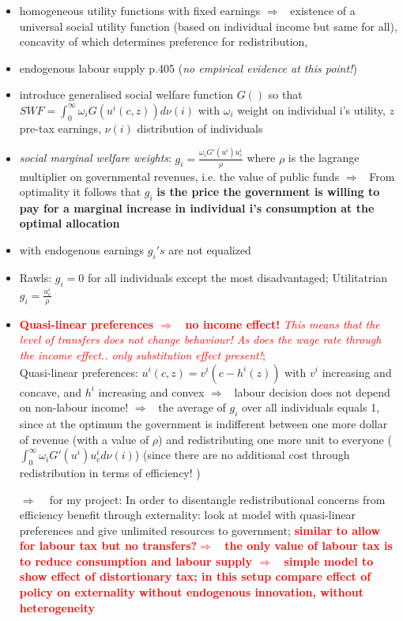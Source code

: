 \documentclass[12pt]{article}
\newcommand{\ar}{$\Rightarrow$ \ }
\newcommand{\tr}[1]{\textcolor{red}{#1}}
\begin{document}
\begin{itemize}
\begin{itemize}
\item homogeneous utility functions  with fixed earnings \ar existence of a universal social utility function (based on individual income but same for all), concavity of which determines preference for redistribution, 
\item endogenous labour supply p.405 (\textit{no empirical evidence at this point!})
\item introduce generalised social welfare function $G()$ so that $SWF=\int_0^\infty \omega_i G(u^i(c,z))d\nu(i)$ with $\omega_i$ weight on individual i's utility, $z$ pre-tax earnings, $\nu(i)$ distribution of individuals 
\item \textit{social marginal welfare weights}: $g_i=\frac{\omega_iG'(u^i)u^i_c}{\rho}$ where $\rho$ is the lagrange multiplier on governmental revenues, i.e. the value of public funds \ar From optimality it follows that $g_i$ \textbf{is the price the government is willing to pay for a marginal increase in individual i's consumption at the optimal allocation }
\item with endogenous earnings $g_i's$ are not equalized
\item Rawls: $g_i=0$ for all individuals except the most disadvantaged; Utilitatrian $g_i=\frac{u^i_c}{\rho}$
\item \tr{\textbf{Quasi-linear preferences \ar no income effect!} \textit{This means that the level of transfers does not change behaviour! As does the wage rate through the income effect.. only substitution effect present!}}; \\
Quasi-linear preferences: $u^i(c,z)= v^i(c-h^i(z))$ with $v^i$ increasing and concave, and $h^i$ increasing and convex \ar labour decision does not depend on non-labour income! \ar the average of $g_i$ over all individuals equals 1, since at the optimum the government is indifferent between one more dollar of revenue (with a value of $\rho$) and redistributing one more unit to everyone ($\int_{0}^{\infty}\omega_iG'(u^i)u^i_cd\nu(i)$) (since there are no additional cost through redistribution in terms of efficiency! )
\item[\ar] for my project: In order to disentangle redistributional concerns from efficiency benefit through externality: look at model with quasi-linear preferences and give unlimited resources to government; \tr{\textbf{similar to allow for labour tax but no transfers?\ar the only value of labour tax is to reduce consumption and labour supply \ar simple model to show effect of distortionary tax; in this setup compare effect of policy on externality without endogenous innovation, without heterogeneity}}

\end{itemize}
\end{itemize}
\end{document}
